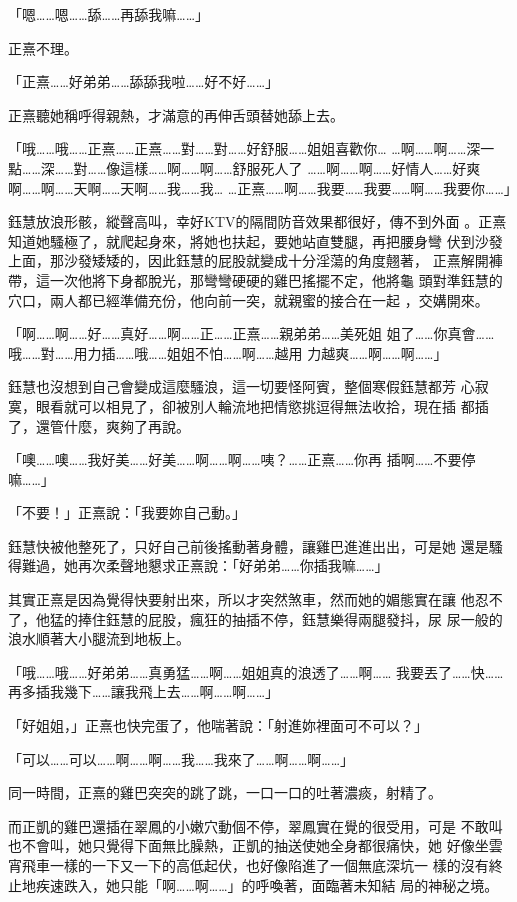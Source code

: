「嗯……嗯……舔……再舔我嘛……」

正熹不理。

「正熹……好弟弟……舔舔我啦……好不好……」

正熹聽她稱呼得親熱，才滿意的再伸舌頭替她舔上去。

「哦……哦……正熹……正熹……對……對……好舒服……姐姐喜歡你…
…啊……啊……深一點……深……對……像這樣……啊……啊……舒服死人了
……啊……啊……好情人……好爽啊……啊……天啊……天啊……我……我…
…正熹……啊……我要……我要……啊……我要你……」

鈺慧放浪形骸，縱聲高叫，幸好KTV的隔間防音效果都很好，傳不到外面
。正熹知道她騷極了，就爬起身來，將她也扶起，要她站直雙腿，再把腰身彎
伏到沙發上面，那沙發矮矮的，因此鈺慧的屁股就變成十分淫蕩的角度翹著，
正熹解開褲帶，這一次他將下身都脫光，那彎彎硬硬的雞巴搖擺不定，他將龜
頭對準鈺慧的穴口，兩人都已經準備充份，他向前一突，就親蜜的接合在一起
，交媾開來。

「啊……啊……好……真好……啊……正……正熹……親弟弟……美死姐
姐了……你真會……哦……對……用力插……哦……姐姐不怕……啊……越用
力越爽……啊……啊……」

鈺慧也沒想到自己會變成這麼騷浪，這一切要怪阿賓，整個寒假鈺慧都芳
心寂寞，眼看就可以相見了，卻被別人輪流地把情慾挑逗得無法收拾，現在插
都插了，還管什麼，爽夠了再說。

「噢……噢……我好美……好美……啊……啊……咦？……正熹……你再
插啊……不要停嘛……」

「不要！」正熹說：「我要妳自己動。」

鈺慧快被他整死了，只好自己前後搖動著身體，讓雞巴進進出出，可是她
還是騷得難過，她再次柔聲地懇求正熹說：「好弟弟……你插我嘛……」

其實正熹是因為覺得快要射出來，所以才突然煞車，然而她的媚態實在讓
他忍不了，他猛的捧住鈺慧的屁股，瘋狂的抽插不停，鈺慧樂得兩腿發抖，尿
尿一般的浪水順著大小腿流到地板上。

「哦……哦……好弟弟……真勇猛……啊……姐姐真的浪透了……啊……
我要丟了……快……再多插我幾下……讓我飛上去……啊……啊……」

「好姐姐，」正熹也快完蛋了，他喘著說：「射進妳裡面可不可以？」

「可以……可以……啊……啊……我……我來了……啊……啊……」

同一時間，正熹的雞巴突突的跳了跳，一口一口的吐著濃痰，射精了。

而正凱的雞巴還插在翠鳳的小嫩穴動個不停，翠鳳實在覺的很受用，可是
不敢叫也不會叫，她只覺得下面無比臊熱，正凱的抽送使她全身都很痛快，她
好像坐雲宵飛車一樣的一下又一下的高低起伏，也好像陷進了一個無底深坑一
樣的沒有終止地疾速跌入，她只能「啊……啊……」的呼喚著，面臨著未知結
局的神秘之境。


